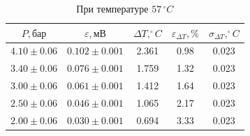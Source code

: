 \documentclass[a4paper,12pt]{article}
\begin{document}
\begin{table}[h!]
    \centering
    \begin{tabular}{|c|c|c|c|c|}
        \hline
        $P, \text{бар}$ & $\varepsilon, \text{мВ}$ & $\Delta T, ^\circ C$ & $\varepsilon_{\Delta T}, \%$ & $\sigma_{\Delta T}, ^\circ C$ \\
        \hline
        $4.10 \pm 0.06$ & $0.102 \pm 0.001$ & 2.361 & 0.98 & 0.023 \\ \hline
        $3.40 \pm 0.06$ & $0.076 \pm 0.001$ & 1.759 & 1.32 & 0.023 \\ \hline
        $3.00 \pm 0.06$ & $0.061 \pm 0.001$ & 1.412 & 1.64 & 0.023 \\ \hline
        $2.50 \pm 0.06$ & $0.046 \pm 0.001$ & 1.065 & 2.17 & 0.023 \\ \hline
        $2.00 \pm 0.06$ & $0.030 \pm 0.001$ & 0.694 & 3.33 & 0.023 \\ \hline
    \end{tabular}
    \caption{При температуре $57\,^\circ C$}
    \label{tab:56C}
\end{table}
\end{document}
